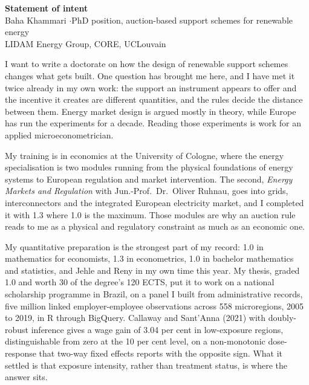 \documentclass[a4paper,11pt]{article}
\begin{document}
\begin{center}
{\large\bfseries Statement of intent}\\[3pt]
{\small Baha Khammari \quad$\cdot$\quad PhD position, auction-based support schemes for renewable energy}\\
{\small LIDAM Energy Group, CORE, UCLouvain}
\end{center}

\vspace{2mm}

I want to write a doctorate on how the design of renewable support schemes changes what gets built. One question has brought me here, and I have met it twice already in my own work: the support an instrument appears to offer and the incentive it creates are different quantities, and the rules decide the distance between them. Energy market design is argued mostly in theory, while Europe has run the experiments for a decade. Reading those experiments is work for an applied microeconometrician.

My training is in economics at the University of Cologne, where the energy specialisation is two modules running from the physical foundations of energy systems to European regulation and market intervention. The second, \textit{Energy Markets and Regulation} with Jun.-Prof.\ Dr.\ Oliver Ruhnau, goes into grids, interconnectors and the integrated European electricity market, and I completed it with 1.3 where 1.0 is the maximum. Those modules are why an auction rule reads to me as a physical and regulatory constraint as much as an economic one.

My quantitative preparation is the strongest part of my record: 1.0 in mathematics for economists, 1.3 in econometrics, 1.0 in bachelor mathematics and statistics, and Jehle and Reny in my own time this year. My thesis, graded 1.0 and worth 30 of the degree's 120 ECTS, put it to work on a national scholarship programme in Brazil, on a panel I built from administrative records, five million linked employer-employee observations across 558 microregions, 2005 to 2019, in R through BigQuery. Callaway and Sant'Anna (2021) with doubly-robust inference gives a wage gain of 3.04 per cent in low-exposure regions, distinguishable from zero at the 10 per cent level, on a non-monotonic dose-response that two-way fixed effects reports with the opposite sign. What it settled is that exposure intensity, rather than treatment status, is where the answer sits.
\end{document}
